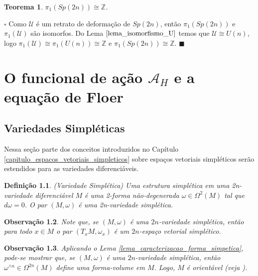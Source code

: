 \documentclass[12pt]{book}
\newtheorem{teorema}{Teorema}[section]
\newtheorem{definicao}[teorema]{Definição}
\newtheorem{observacao}[teorema]{Observação}
\newenvironment{prova}[1]{$\square$ #1}{\hfill$\blacksquare$}
\newcommand{\funcionalH}{\mathcal{A}_{H}}
\newcommand{\grupofundamental}[1]{\pi_{1}(#1)}
\newcommand{\gruposimpletico}[1]{Sp(#1)}
\newcommand{\inteiros}{\mathbb{Z}}
\newcommand{\matrizSimpleticaOrtogonal}{\mathcal{U}}
\newcommand{\matrizunitaria}[1]{U(#1)}
\begin{document}
	\begin{teorema}
		$\grupofundamental{\gruposimpletico{2n}} \cong \inteiros$.
	\end{teorema}
	\begin{prova}
		Como $\matrizSimpleticaOrtogonal$ é um retrato de deformação de $\gruposimpletico{2n}$, então $\grupofundamental{\gruposimpletico{2n}}$ e $\grupofundamental{\matrizSimpleticaOrtogonal}$ são isomorfos. Do Lema $\ref{lema_isomorfismo_U}$ temos que $\matrizSimpleticaOrtogonal\cong \matrizunitaria{n}$, logo $\grupofundamental{\matrizSimpleticaOrtogonal} \cong \grupofundamental{\matrizunitaria{n}} \cong \inteiros$ e $\grupofundamental{\gruposimpletico{2n}} \cong \inteiros$.
	\end{prova}
	
	
	\chapter{O funcional de ação $\funcionalH$ e a equação de Floer}
	\section{Variedades Simpléticas}\label{secao_variedade_simpletica}
	
	Nessa seção parte dos conceitos introduzidos no Capítulo \ref{capitulo_espacos_vetoriais_simpleticos} sobre espaços vetoriais simpléticos serão estendidos para as variedades diferenciáveis.
	
	\begin{definicao}
		(Variedade Simplética) Uma estrutura simplética em uma 2n-variedade diferenciável $M$ é uma 2-forma não-degenerada $\omega\in \Omega^{2}(M)$ tal que $d\omega=0$. O par $(M, \omega)$ é uma 2n-variedade simplética.
	\end{definicao}
	
	\begin{observacao}
		Note que, se $(M, \omega)$ é uma $2n$-variedade simplética, então para todo $x \in M$ o par $(T_{x}M, \omega_{x})$ é um $2n$-espaço vetorial simplético.
	\end{observacao}
	
	\begin{observacao}
		Aplicando o Lema \ref{lema_caracterizacao_forma_simpetica}, pode-se mostrar que, se $(M, \omega)$ é uma $2n$-variedade simplética, então $\omega^{\wedge n} \in \Omega^{2n}(M)$ define uma forma-volume em $M$. Logo, $M$ é orientável (veja \cite{warner_manifolds}).
	\end{observacao}
	
\end{document}
